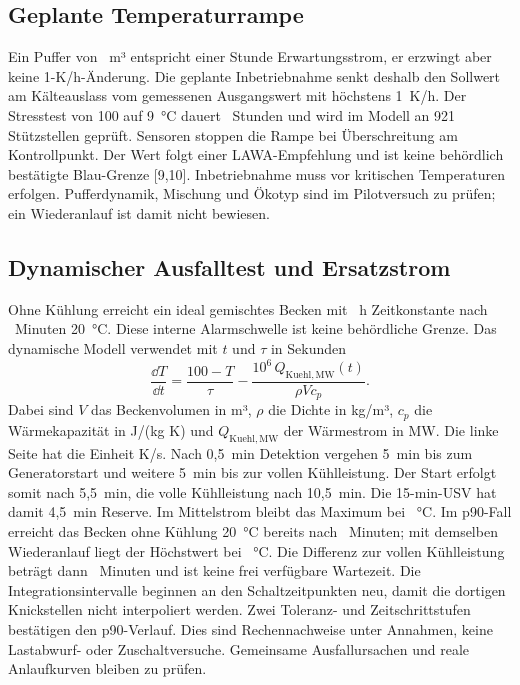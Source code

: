 \subsection{Geplante Temperaturrampe}

Ein Puffer von \BufferVolume~m³ entspricht einer Stunde Erwartungsstrom, er erzwingt aber keine 1-K/h-Änderung. Die geplante Inbetriebnahme senkt deshalb den Sollwert am Kälteauslass vom gemessenen Ausgangswert mit höchstens 1~K/h. Der Stresstest von 100 auf 9~°C dauert \ReturnRampHours~Stunden und wird im Modell an 921 Stützstellen geprüft. Sensoren stoppen die Rampe bei Überschreitung am Kontrollpunkt. Der Wert folgt einer LAWA-Empfehlung und ist keine behördlich bestätigte Blau-Grenze [9,10]. Inbetriebnahme muss vor kritischen Temperaturen erfolgen. Pufferdynamik, Mischung und Ökotyp sind im Pilotversuch zu prüfen; ein Wiederanlauf ist damit nicht bewiesen.

\subsection{Dynamischer Ausfalltest und Ersatzstrom}

Ohne Kühlung erreicht ein ideal gemischtes Becken mit \PoolTau~h Zeitkonstante nach \FailureMinutes~Minuten 20~°C. Diese interne Alarmschwelle ist keine behördliche Grenze. Das dynamische Modell verwendet mit \(t\) und \(\tau\) in Sekunden
\begin{equation}
\frac{\dd T}{\dd t}=\frac{100-T}{\tau}-\frac{10^6\,Q_{\mathrm{Kuehl,MW}}(t)}{\rho Vc_p}.
\end{equation}
Dabei sind \(V\) das Beckenvolumen in m³, \(\rho\) die Dichte in kg/m³, \(c_p\) die Wärmekapazität in J/(kg K) und \(Q_{\mathrm{Kuehl,MW}}\) der Wärmestrom in MW. Die linke Seite hat die Einheit K/s.
Nach 0,5~min Detektion vergehen 5~min bis zum Generatorstart und weitere 5~min bis zur vollen Kühlleistung. Der Start erfolgt somit nach 5,5~min, die volle Kühlleistung nach 10,5~min. Die 15-min-USV hat damit 4,5~min Reserve. Im Mittelstrom bleibt das Maximum bei \RecoveryPeak~°C. Im p90-Fall erreicht das Becken ohne Kühlung 20~°C bereits nach \FailureMinutesNinety~Minuten; mit demselben Wiederanlauf liegt der Höchstwert bei \RecoveryPeakNinety~°C. Die Differenz zur vollen Kühlleistung beträgt dann \RecoveryMarginNinety~Minuten und ist keine frei verfügbare Wartezeit. Die Integrationsintervalle beginnen an den Schaltzeitpunkten neu, damit die dortigen Knickstellen nicht interpoliert werden. Zwei Toleranz- und Zeitschrittstufen bestätigen den p90-Verlauf. Dies sind Rechennachweise unter Annahmen, keine Lastabwurf- oder Zuschaltversuche. Gemeinsame Ausfallursachen und reale Anlaufkurven bleiben zu prüfen.

